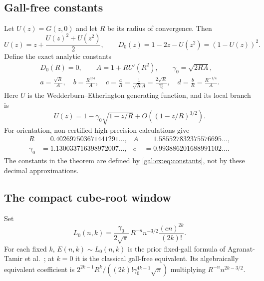 \documentclass[11pt,letterpaper]{article}
\numberwithin{equation}{section}
\theoremstyle{definition}\newtheorem{definition}[theorem]{Definition}
\theoremstyle{remark}\newtheorem{remark}[theorem]{Remark}
\newcommand{\Lfix}{L_0(n,k)}
\begin{document}
\subsection{Gall-free constants}
Let $U(z)=G(z,0)$ and let $R$ be its radius of convergence. Then
\begin{equation}\label{gal:cx:eq:U}
U(z)=z+\frac{U(z)^2+U(z^2)}2,
\qquad D_0(z)=1-2z-U(z^2)=(1-U(z))^2.
\end{equation}
Define the exact analytic constants
\begin{equation}\label{gal:cx:eq:constants}
\begin{gathered}
D_0(R)=0,\qquad A=1+R U'(R^2),\qquad \gamma_0=\sqrt{2RA},\\
a=\frac{\sqrt R}{A},\quad b=\frac{R^{3/4}}A,\quad
c=\frac aR=\frac{1}{\sqrt R A}=\frac{2\sqrt R}{\gamma_0^2},
\quad d=\frac bR=\frac{R^{-1/4}}A.
\end{gathered}
\end{equation}
Here $U$ is the Wedderburn--Etherington generating function, and its local branch is
\begin{equation}\label{gal:cx:eq:Ulocal}
U(z)=1-\gamma_0\sqrt{1-z/R}+O((1-z/R)^{3/2}).
\end{equation}
For orientation, non-certified high-precision calculations give
\begin{equation}\label{gal:cx:eq:decimals}
\begin{aligned}
R&=0.402697503671441291\ldots,& A&=1.585527832375576695\ldots,\\
\gamma_0&=1.130033716398972007\ldots,&c&=0.993886201688991102\ldots.
\end{aligned}
\end{equation}
The constants in the theorem are defined by \eqref{gal:cx:eq:constants}, not by these decimal approximations.

\subsection{The compact cube-root window}
Set
\begin{equation}\label{gal:cx:eq:fixed}
\Lfix=\frac{\gamma_0}{2\sqrt\pi}\,R^{-n}n^{-3/2}
       \frac{(cn)^{2k}}{(2k)!}.
\end{equation}
For each fixed $k$, $E(n,k)\sim\Lfix$ is the prior fixed-gall formula of Agranat-Tamir et al.~\cite[Section 5.5]{comparison}; at $k=0$ it is the classical gall-free equivalent. Its algebraically equivalent coefficient is
$2^{2k-1}R^k/((2k)!\gamma_0^{4k-1}\sqrt\pi)$ multiplying $R^{-n}n^{2k-3/2}$.
\end{document}
